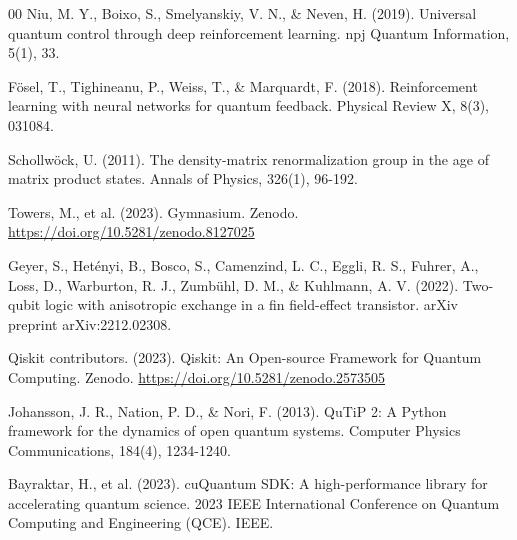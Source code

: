 \documentclass[preprint,12pt, a4paper]{elsarticle}
\begin{document}
\begin{thebibliography}{00}
 Niu, M. Y., Boixo, S., Smelyanskiy, V. N., \& Neven, H. (2019). Universal quantum control through deep reinforcement learning. npj Quantum Information, 5(1), 33.

 F\"{o}sel, T., Tighineanu, P., Weiss, T., \& Marquardt, F. (2018). Reinforcement learning with neural networks for quantum feedback. Physical Review X, 8(3), 031084.

 Schollw\"{o}ck, U. (2011). The density-matrix renormalization group in the age of matrix product states. Annals of Physics, 326(1), 96-192.

 Towers, M., et al. (2023). Gymnasium. Zenodo. \url{https://doi.org/10.5281/zenodo.8127025}

 Geyer, S., Het\'{e}nyi, B., Bosco, S., Camenzind, L. C., Eggli, R. S., Fuhrer, A., Loss, D., Warburton, R. J., Zumb\"{u}hl, D. M., \& Kuhlmann, A. V. (2022). Two-qubit logic with anisotropic exchange in a fin field-effect transistor. arXiv preprint arXiv:2212.02308.

 Qiskit contributors. (2023). Qiskit: An Open-source Framework for Quantum Computing. Zenodo. \url{https://doi.org/10.5281/zenodo.2573505}

 Johansson, J. R., Nation, P. D., \& Nori, F. (2013). QuTiP 2: A Python framework for the dynamics of open quantum systems. Computer Physics Communications, 184(4), 1234-1240.

 Bayraktar, H., et al. (2023). cuQuantum SDK: A high-performance library for accelerating quantum science. 2023 IEEE International Conference on Quantum Computing and Engineering (QCE). IEEE.

\end{thebibliography}
\end{document}
